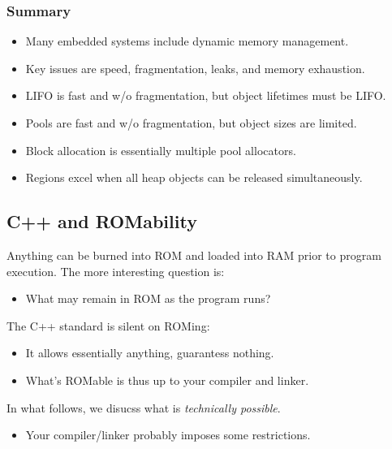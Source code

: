 \subsubsection{Summary}
\begin{itemize}
  \item Many embedded systems include dynamic memory management.
  \item Key issues are speed, fragmentation, leaks, and memory exhaustion.
  \item LIFO is fast and w/o fragmentation, but object lifetimes must be LIFO.
  \item Pools are fast and w/o fragmentation, but object sizes are limited.
  \item Block allocation is essentially multiple pool allocators.
  \item Regions excel when all heap objects can be released simultaneously.
\end{itemize}


\subsection{C++ and ROMability}
Anything can be burned into ROM and loaded into RAM prior to program execution.
The more interesting question is:
\begin{itemize}
  \item What may remain in ROM as the program runs?
\end{itemize}
The C++ standard is silent on ROMing:
\begin{itemize}
  \item It allows essentially anything, guarantess nothing.
  \item What's ROMable is thus up to your compiler and linker.
\end{itemize}
In what follows, we disucss what is \textit{technically possible}.
\begin{itemize}
  \item Your compiler/linker probably imposes some restrictions.
\end{itemize}

